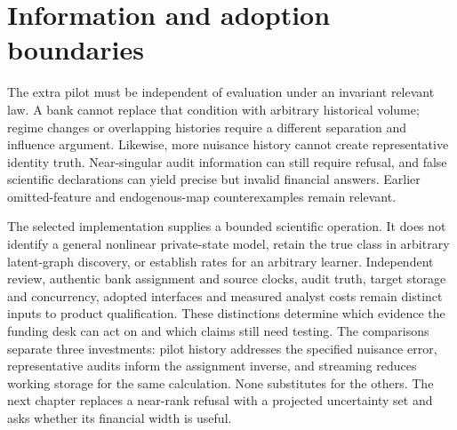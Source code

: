 \section{Information and adoption boundaries}
\label{v10:limits}

The extra pilot must be independent of evaluation under an invariant relevant
law. A bank cannot replace that condition with arbitrary historical volume;
regime changes or overlapping histories require a different separation and
influence argument. Likewise, more nuisance history cannot create representative
identity truth. Near-singular audit information can still require refusal, and
false scientific declarations can yield precise but invalid financial answers.
Earlier omitted-feature and endogenous-map counterexamples remain relevant.

The selected implementation supplies a bounded scientific operation. It does
not identify a general nonlinear private-state model, retain the true class in
arbitrary latent-graph discovery, or establish rates for an arbitrary learner.
Independent review, authentic bank assignment and source clocks, audit truth,
target storage and concurrency, adopted interfaces and measured analyst costs
remain distinct inputs to product qualification. These distinctions determine
which evidence the funding desk can act on and which claims still need testing. The comparisons separate three investments: pilot history addresses the specified nuisance error, representative audits inform the assignment inverse, and streaming reduces working storage for the same calculation. None substitutes for the others. The next chapter replaces a near-rank refusal with a projected uncertainty set and asks whether its financial width is useful.

